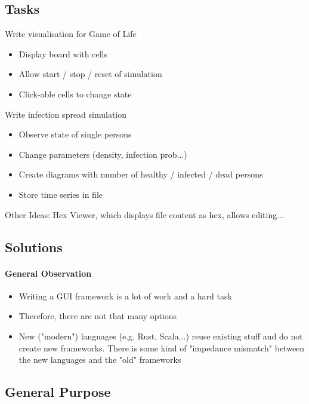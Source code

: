 

\subsection{Tasks}

Write visualisation for Game of Life

\begin{itemize}
	\item Display board with cells
	\item Allow start / stop / reset of simulation
	\item Click-able cells to change state
\end{itemize}

Write infection spread simulation

\begin{itemize}
	\item Observe state of single persons
	\item Change parameters (density, infection prob...)
	\item Create diagrams with number of healthy / infected / dead persons
	\item Store time series in file
\end{itemize}

Other Ideas: Hex Viewer, which displays file content as hex, allows editing...

\subsection{Solutions}

\paragraph{General Observation}

\begin{itemize}
	\item Writing a GUI framework is a lot of work and a hard task
	\item Therefore, there are not that many options
	\item New ("modern") languages (e.g. Rust, Scala...) reuse existing stuff and do not create new frameworks. There is some kind of "impedance mismatch" between the new languages and the "old" frameworks
\end{itemize}



\subsection{General Purpose}

